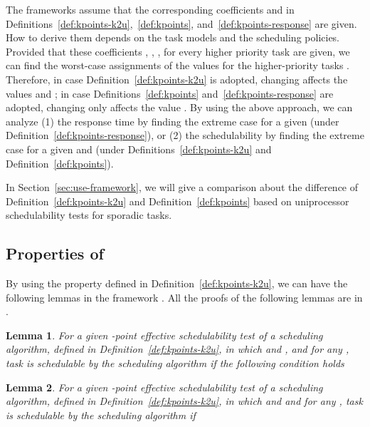 \documentclass[10pt,conference]{IEEEtran}
\newcommand{\frameworkku}[1]{}
\newtheorem{lemma}{Lemma}
\begin{document}
The frameworks assume that the corresponding coefficients 
and  in Definitions~\ref{def:kpoints-k2u},~\ref{def:kpoints},
and~\ref{def:kpoints-response} are given. How to derive them depends
on the task models and the scheduling policies.  Provided that these
coefficients , , ,  for every higher
priority task  are given, we can
find the worst-case assignments of the values  for
the higher-priority tasks . Therefore, in case
Definition~\ref{def:kpoints-k2u} is adopted, changing  affects the
values  and ; in case
Definitions~\ref{def:kpoints} and~\ref{def:kpoints-response} are
adopted, changing  only affects the value . 
By using the above approach, we can analyze (1)
the response time by finding the extreme case for a given  (under
Definition~\ref{def:kpoints-response}), or (2) the schedulability by
finding the extreme case for a given  and   (under
Definitions~\ref{def:kpoints-k2u} and Definition~\ref{def:kpoints}). 

In Section~\ref{sec:use-framework}, we will give a comparison about
the difference of Definition~\ref{def:kpoints-k2u} and Definition~\ref{def:kpoints} based on uniprocessor schedulability tests
for sporadic tasks.

\subsection{Properties of \frameworkku{}}

By using the property defined in Definition~\ref{def:kpoints-k2u}, we
can have the following lemmas in the \frameworkku{} framework
\cite{DBLP:journals/corr/abs-1501.07084,DBLP:conf/rtss/ChenHL15}. All the proofs of the
following lemmas are in
\cite{DBLP:journals/corr/abs-1501.07084,DBLP:conf/rtss/ChenHL15}.

  
\begin{lemma}
\label{lemma:framework-constrained-k2u}
For a given -point effective schedulability test of a scheduling 
algorithm, defined in
Definition~\ref{def:kpoints-k2u},
in which  and , and  for any
, task  is schedulable by the scheduling
algorithm if the following condition holds 

\end{lemma}


\begin{lemma}
\label{lemma:framework-totalU-constrained-k2u}
For a given -point effective schedulability test of a scheduling
algorithm, defined in
Definition~\ref{def:kpoints-k2u},
in which  and  and  for any
, task  is schedulable by the scheduling
algorithm if 

\end{lemma}
\end{document}
